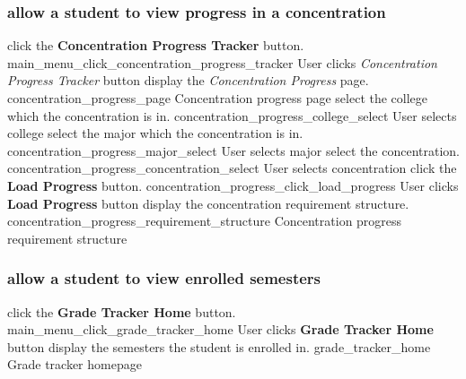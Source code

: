 \documentclass[12pt]{article}
\newenvironment{requirement}[1]
{
    \renewcommand{\thesubsubsection}{R\arabic{subsubsection}.}
    \renewcommand{\labelenumi}{
        \arabic{subsubsection}.\arabic{enumi}
    }
    \renewcommand{\labelenumii}{
        \arabic{subsubsection}.\arabic{enumi}.\arabic{enumii}
    }
    \renewcommand{\labelenumiii}{
        \arabic{subsubsection}.\arabic{enumi}.\arabic{enumii}.\arabic{enumiii}
    }
    \renewcommand{\labelenumiv}{
        \arabic{subsubsection}.\arabic{enumi}.\arabic{enumii}.\arabic{enumiii}.\arabic{enumiv}
    }
    \subsubsection{#1}
    \begin{enumerate}
}
{
    \end{enumerate}
}
\begin{document}
\begin{requirement}{\sysshall allow a student to view progress in a concentration}
    \mainmenu
    \screenshotstep
      {\stushall click the \textbf{Concentration Progress Tracker} button.}
      {main_menu_click_concentration_progress_tracker}
      {User clicks \emph{Concentration Progress Tracker} button}
    \screenshotstep
      {\sysshall display the \emph{Concentration Progress} page.}
      {concentration_progress_page}
      {Concentration progress page}
    \screenshotstep
      {\stushall select the college which the concentration is in.}
      {concentration_progress_college_select}
      {User selects college}
    \screenshotstep
      {\stushall select the major which the concentration is in.}
      {concentration_progress_major_select}
      {User selects major}
    \screenshotstep
      {\stushall select the concentration.}
      {concentration_progress_concentration_select}
      {User selects concentration}
    \screenshotstep
      {\stushall click the \textbf{Load Progress} button.}
      {concentration_progress_click_load_progress}
      {User clicks \textbf{Load Progress} button}
    \screenshotstep
      {\sysshall display the concentration requirement structure.}
      {concentration_progress_requirement_structure}
      {Concentration progress requirement structure}
\end{requirement}

\newcommand{\navsemesters}{
    \mainmenu
    \screenshotstep
      {\stushall click the \textbf{Grade Tracker Home} button.}
      {main_menu_click_grade_tracker_home}
      {User clicks \textbf{Grade Tracker Home} button}
    \screenshotstep
      {\sysshall display the semesters the student is enrolled in.}
      {grade_tracker_home}
      {Grade tracker homepage}
}

\begin{requirement}{\sysshall allow a student to view enrolled semesters}
    \navsemesters
\end{requirement}
\end{document}
